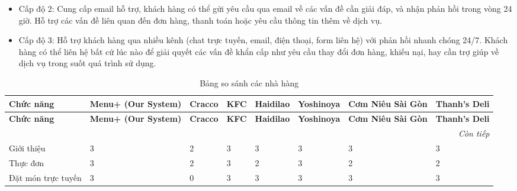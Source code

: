 \begin{enumerate}
\begin{itemize}
		      \item Cấp độ 2: Cung cấp email hỗ trợ, khách hàng có thể gửi yêu cầu qua email về các vấn đề cần giải đáp, và nhận phản hồi trong vòng 24 giờ. Hỗ trợ các vấn đề liên quan đến đơn hàng, thanh toán hoặc yêu cầu thông tin thêm về dịch vụ.
		      \item Cấp độ 3: Hỗ trợ khách hàng qua nhiều kênh (chat trực tuyến, email, điện thoại, form liên hệ) với phản hồi nhanh chóng 24/7. Khách hàng có thể liên hệ bất cứ lúc nào để giải quyết các vấn đề khẩn cấp như yêu cầu thay đổi đơn hàng, khiếu nại, hay cần trợ giúp về dịch vụ trong suốt quá trình sử dụng.
	      \end{itemize}
\end{enumerate}

\begin{longtable}{|p{2cm}|p{1.5cm}|p{1.5cm}|p{1.5cm}|p{1.5cm}|p{1.5cm}|p{1.5cm}|p{1.5cm}|}
	\caption{Bảng so sánh các nhà hàng}                                                                                                                                                     \\
	\hline
	\textbf{Chức năng}          & \textbf{Menu+ (Our System)} & \textbf{Cracco} & \textbf{KFC} & \textbf{Haidilao} & \textbf{Yoshinoya} & \textbf{Cơm Niêu Sài Gòn} & \textbf{Thanh's Deli} \\
	\hline
	\endfirsthead
	\hline
	\textbf{Chức năng}          & \textbf{Menu+ (Our System)} & \textbf{Cracco} & \textbf{KFC} & \textbf{Haidilao} & \textbf{Yoshinoya} & \textbf{Cơm Niêu Sài Gòn} & \textbf{Thanh's Deli} \\
	\endhead
	\hline
	\multicolumn{8}{|r|}{\small\slshape Còn tiếp}                                                                                                                                           \\ \hline
	\endfoot
	\hline
	\endlastfoot
	Giới thiệu                  & 3                           & 2               & 3            & 3                 & 3                  & 3                         & 3                     \\
	\hline
	Thực đơn                    & 3                           & 2               & 3            & 2                 & 3                  & 2                         & 2                     \\
	\hline
	Đặt món trực tuyến          & 3                           & 0               & 3            & 3                 & 3                  & 3                         & 3                     \\

\end{longtable}
